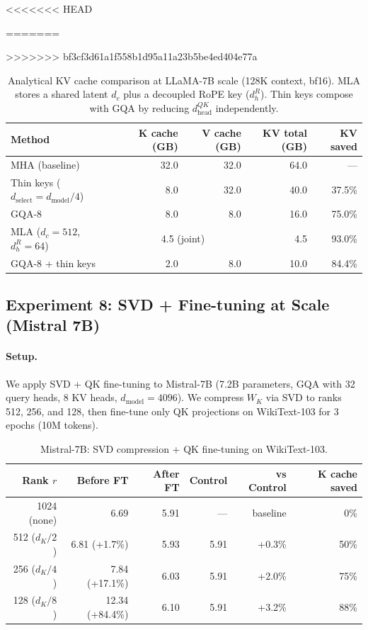 \documentclass{article} %
\newcommand{\dmodel}{d_{\text{model}}}
\newcommand{\dselect}{d_{\text{select}}}
\begin{document}
\begin{table}[h]
\centering
<<<<<<< HEAD
\caption{Analytical KV cache comparison at LLaMA-7B scale (128K context, bf16). Thin keys compose with GQA by reducing $d_k$ independently.}
=======
\caption{Analytical KV cache comparison at LLaMA-7B scale (128K context, bf16). MLA stores a shared latent $d_c$ plus a decoupled RoPE key ($d_h^R$). Thin keys compose with GQA by reducing $d_{\text{head}}^{QK}$ independently.}
>>>>>>> bf3cf3d61a1f558b1d95a11a23b5be4ed404e77a
\label{tab:kv_7b_analytical}
\begin{tabular}{lrrrr}
\toprule
Method & K cache (GB) & V cache (GB) & KV total (GB) & KV saved \\
\midrule
MHA (baseline) & 32.0 & 32.0 & 64.0 & --- \\
\midrule
Thin keys ($\dselect = \dmodel/4$) & 8.0 & 32.0 & 40.0 & 37.5\% \\
GQA-8 & 8.0 & 8.0 & 16.0 & 75.0\% \\
MLA ($d_c\!=\!512$, $d_h^R\!=\!64$) & \multicolumn{2}{c}{4.5 (joint)} & 4.5 & 93.0\% \\
\midrule
GQA-8 + thin keys & 2.0 & 8.0 & 10.0 & 84.4\% \\
\bottomrule
\end{tabular}
\end{table}


\subsection{Experiment 8: SVD + Fine-tuning at Scale (Mistral 7B)}

\paragraph{Setup.}
We apply SVD + QK fine-tuning to Mistral-7B (7.2B parameters, GQA with 32 query heads, 8 KV heads, $\dmodel = 4096$). We compress $W_K$ via SVD to ranks 512, 256, and 128, then fine-tune only QK projections on WikiText-103 for 3 epochs (10M tokens).

\begin{table}[h]
\centering
\caption{Mistral-7B: SVD compression + QK fine-tuning on WikiText-103.}
\label{tab:mistral7b}
\begin{tabular}{rrrrrr}
\toprule
Rank $r$ & Before FT & After FT & Control & vs Control & K cache saved \\
\midrule
1024 (none) & 6.69 & 5.91 & --- & baseline & 0\% \\
512 ($d_K/2$) & 6.81 (+1.7\%) & 5.93 & 5.91 & +0.3\% & 50\% \\
256 ($d_K/4$) & 7.84 (+17.1\%) & 6.03 & 5.91 & +2.0\% & 75\% \\
128 ($d_K/8$) & 12.34 (+84.4\%) & 6.10 & 5.91 & +3.2\% & 88\% \\
\bottomrule
\end{tabular}
\end{table}
\end{document}
